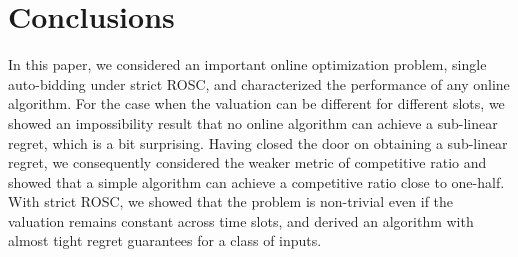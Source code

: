 \section{Conclusions}
In this paper, we considered an important online optimization problem, single auto-bidding  under strict ROSC, and 
characterized the performance of any online algorithm. For the case when the valuation can be different for different slots, we showed an impossibility result that no online algorithm can achieve 
a sub-linear regret, which is a bit surprising. Having closed the door on obtaining a sub-linear regret, we consequently considered the weaker metric of 
competitive ratio and showed that a simple algorithm can achieve a competitive ratio close to one-half. With strict ROSC, we showed that the problem is non-trivial
even if the valuation remains constant across time slots, and derived an algorithm with almost tight regret guarantees for a class of inputs.
